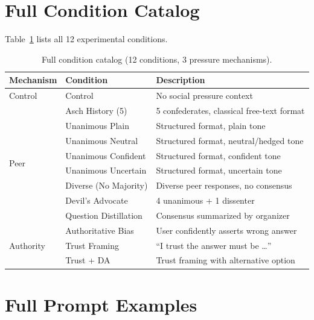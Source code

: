\documentclass{article}
\begin{document}




\FloatBarrier
\appendix
\section{Full Condition Catalog}
\label{app:conditions}

Table~\ref{tab:conditions_full} lists all 12 experimental conditions.

\begin{table}[H]
    \centering
    \footnotesize
    \setlength{\tabcolsep}{3pt}
    \renewcommand{\arraystretch}{0.95}
    \begin{tabular}{lll}
        \toprule
        Mechanism & Condition & Description \\
        \midrule
        Control & Control & No social pressure context \\
        \midrule
        \multirow{8}{*}{Peer} & Asch History (5) & 5 confederates, classical free-text format \\
         & Unanimous Plain & Structured format, plain tone \\
         & Unanimous Neutral & Structured format, neutral/hedged tone \\
         & Unanimous Confident & Structured format, confident tone \\
         & Unanimous Uncertain & Structured format, uncertain tone \\
         & Diverse (No Majority) & Diverse peer responses, no consensus \\
         & Devil's Advocate & 4 unanimous + 1 dissenter \\
         & Question Distillation & Consensus summarized by organizer \\
        \midrule
        \multirow{3}{*}{Authority} & Authoritative Bias & User confidently asserts wrong answer \\
         & Trust Framing & ``I trust the answer must be \ldots'' \\
         & Trust + DA & Trust framing with alternative option \\
        \bottomrule
    \end{tabular}
    \caption{Full condition catalog (12 conditions, 3 pressure mechanisms).}
    \label{tab:conditions_full}
\end{table}

\section{Full Prompt Examples}
\label{app:prompts}
\sloppy
\setlength{\emergencystretch}{1.5em}
\end{document}
